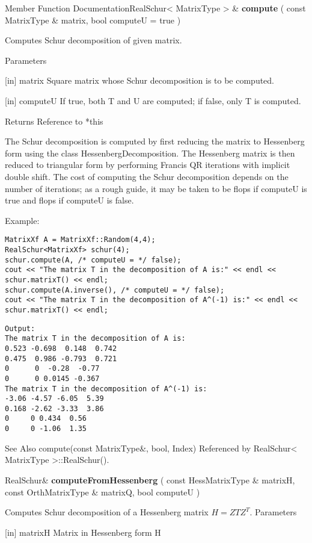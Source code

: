 Member Function DocumentationRealSchur< MatrixType > \& \textbf{compute}  ( const MatrixType \&  matrix,    bool  computeU = true   )   

Computes Schur decomposition of given matrix. 

Parameters

[in] matrix Square matrix whose Schur decomposition is to be computed.  

[in] computeU If true, both T and U are computed; if false, only T is computed.  

Returns Reference to *this 

The Schur decomposition is computed by first reducing the matrix to Hessenberg form using the class HessenbergDecomposition. The Hessenberg matrix is then reduced to triangular form by performing Francis QR iterations with implicit double shift. The cost of computing the Schur decomposition depends on the number of iterations; as a rough guide, it may be taken to be  flops if computeU is true and  flops if computeU is false.


Example:
\begin{lstlisting}
MatrixXf A = MatrixXf::Random(4,4);
RealSchur<MatrixXf> schur(4);
schur.compute(A, /* computeU = */ false);
cout << "The matrix T in the decomposition of A is:" << endl << schur.matrixT() << endl;
schur.compute(A.inverse(), /* computeU = */ false);
cout << "The matrix T in the decomposition of A^(-1) is:" << endl << schur.matrixT() << endl;
\end{lstlisting}

\begin{verbatim}
Output:
The matrix T in the decomposition of A is:
0.523 -0.698  0.148  0.742
0.475  0.986 -0.793  0.721
0      0  -0.28  -0.77
0      0 0.0145 -0.367
The matrix T in the decomposition of A^(-1) is:
-3.06 -4.57 -6.05  5.39
0.168 -2.62 -3.33  3.86
0     0 0.434  0.56
0     0 -1.06  1.35
\end{verbatim}


See Also
compute(const MatrixType\&, bool, Index) 
Referenced by RealSchur< MatrixType >::RealSchur().


\vspace{0.3cm}
RealSchur\& \textbf{computeFromHessenberg}  ( const HessMatrixType \&  matrixH,    const OrthMatrixType \&  matrixQ,    bool  computeU   )   

Computes Schur decomposition of a Hessenberg matrix $H = Z T Z^T$. 
Parameters

[in] matrixH Matrix in Hessenberg form H  

